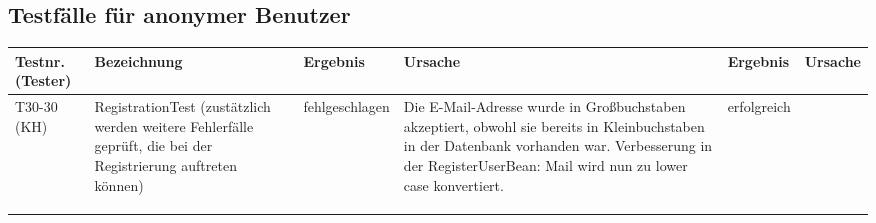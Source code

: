 \begin{landscape}
	\section{Testfälle für anonymer Benutzer}
		\begin{tabular}{|p{2.0cm} |p{5.0cm}|p{3.0cm}|p{5.0cm}|p{4.0cm}|p{4.0cm}|}
			\hline \textbf{Testnr. (Tester)} & \textbf{Bezeichnung} & \textbf{Ergebnis} & \textbf{Ursache} & \textbf{Ergebnis} & \textbf{Ursache} \\
			\hline   T30-30  (KH)  & RegistrationTest (zustätzlich werden weitere Fehlerfälle geprüft, die bei der Registrierung auftreten können)   &   fehlgeschlagen       &    Die E-Mail-Adresse wurde in Großbuchstaben akzeptiert, obwohl sie bereits in Kleinbuchstaben in der Datenbank vorhanden war. Verbesserung in der RegisterUserBean: Mail wird nun zu lower case konvertiert.    &    erfolgreich     &       \\
			\hline       &          &          &        &         &       \\
			\hline       &          &          &        &         &       \\
			\hline       &          &          &        &         &       \\
			\hline 
		\end{tabular} \ \\
		\ \\
			

\end{landscape}
